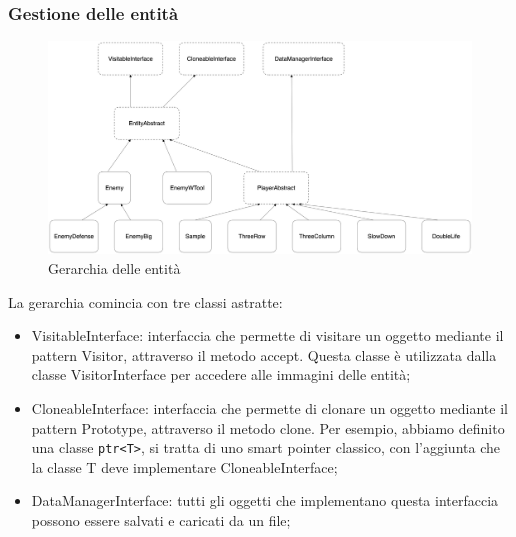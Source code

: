 \documentclass[11pt]{article}
\begin{document}
\subsubsection{Gestione delle entità}
\begin{figure}[ht]
	\centering
	\includegraphics[width=\textwidth]{assets/entity}
	\caption{Gerarchia delle entità}
\end{figure}

La gerarchia comincia con tre classi astratte:
\begin{itemize}
	\item VisitableInterface: interfaccia che permette di visitare un oggetto
		mediante il pattern Visitor, attraverso il metodo accept. Questa classe
		è utilizzata dalla classe VisitorInterface per accedere alle immagini 
		delle entità;

	\item CloneableInterface: interfaccia che permette di clonare un oggetto
		mediante il pattern Prototype, attraverso il metodo clone. Per esempio,
		abbiamo definito una classe \lstinline|ptr<T>|, si tratta di uno smart pointer
		classico, con l'aggiunta che la classe T deve implementare
		CloneableInterface;

	\item DataManagerInterface: tutti gli oggetti che implementano questa
		interfaccia possono essere salvati e caricati da un file;
\end{itemize}
\end{document}
